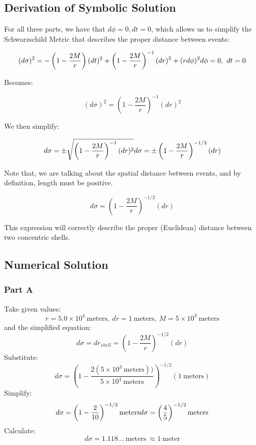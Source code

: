 \documentclass[]{report}
\begin{document}
      \subsection{Derivation of Symbolic Solution}
        For all three parts, we have that $d\phi=0, dt=0$, which allows us to simplify the Schwarzschild Metric that describes the proper distance between events:

        $$
        (d\sigma)^2=-\left(1-\frac{2M}{r}\right)(dt)^2+\left(1-\frac{2M}{r}\right)^{-1}(dr)^2+(rd\phi)^2 \\
        d\phi = 0,\ dt =0
        $$

        Becomes:

        $$
        (d\sigma)^2=\left(1-\frac{2M}{r}\right)^{-1}(dr)^2
        $$

        We then simplify:

        $$
        d\sigma =\pm\sqrt{\left(1-\frac{2M}{r}\right)^{-1}(dr)^2} \\
        d\sigma =\pm\left(1-\frac{2M}{r}\right)^{-1/2}(dr)
        $$

        Note that, we are talking about the spatial distance between events, and by definition, length must be positive.

        \begin{equation}
          d\sigma =\left(1-\frac{2M}{r}\right)^{-1/2}(dr)
        \end{equation}

        This expression will correctly describe the proper (Euclidean) distance between two concentric shells.

      \subsection{Numerical Solution}
        \subsubsection{Part A}
          Take given values:
          $$r=5.0\times10^4\ \text{meters},\ dr=1\ \text{meters},\ M = 5\times10^3\ \text{meters}$$
          and the simplified equation:
          $$
          d\sigma = dr_{shell} = \left(1-\frac{2M}{r}\right)^{-1/2}(dr)
          $$
          Substitute:
          $$
          d\sigma = \left(1-\frac{2(5\times10^3\ \text{meters}))}{5\times10^4\ \text{meters}}\right)^{-1/2}(1\ \text{meters})
          $$
          Simplify:
          $$
          d\sigma = \left(1-\frac{2}{10}\right)^{-1/2}\text{meters}\\
          d\sigma =\left(\frac{4}{5}\right)^{-1/2}\text{meters}
          $$
          Calculate:
          $$d\sigma = 1.118...\ \text{meters}\ \approx 1\ \text{meter}$$
\end{document}
